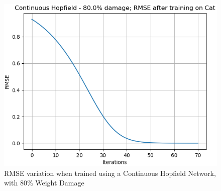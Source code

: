 \documentclass[12pt,a4paper]{article}
\begin{document}
\begin{figure}[H]
\includegraphics[scale=0.4]{images/chn_80_cat.png}
\caption{RMSE variation when trained using a Continuous Hopfield Network, with 80\% Weight Damage}
\end{figure}
\end{document}

